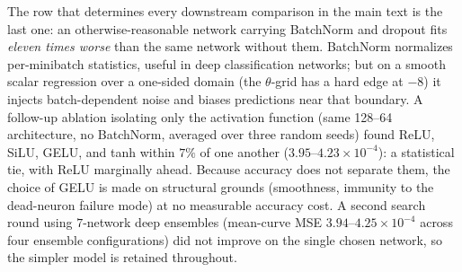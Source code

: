 \documentclass[11pt]{article}
\begin{document}
The row that determines every downstream comparison in the main text is the
last one: an otherwise-reasonable network carrying BatchNorm and dropout fits
\emph{eleven times worse} than the same network without them. BatchNorm
normalizes per-minibatch statistics, useful in deep classification networks;
but on a smooth scalar regression over a one-sided domain (the $\theta$-grid
has a hard edge at $-8$) it injects batch-dependent noise and biases
predictions near that boundary. A follow-up ablation isolating only the
activation function (same 128--64 architecture, no BatchNorm, averaged over
three random seeds) found ReLU, SiLU, GELU, and tanh within $7\%$ of one
another ($3.95$--$4.23\times10^{-4}$): a statistical tie, with ReLU
marginally ahead. Because accuracy does not separate them, the choice of
GELU is made on structural grounds (smoothness, immunity to the dead-neuron
failure mode) at no measurable accuracy cost. A second search round using
$7$-network deep ensembles (mean-curve MSE $3.94$--$4.25\times10^{-4}$
across four ensemble configurations) did not improve on the single chosen
network, so the simpler model is retained throughout.

\begin{table}[h]
\centering
\caption{One-dimensional model: does capacity matter? Curve MSE is
against the denoised response curve, mean over three seeds. Downstream
MSE and 95\% CI length are DNN-ABC at the same scale as the main text's
mean-squared-error table ($40$ replicates/cell, full $p\times J$ grid), one
seed per row.}
\label{stab:capacity1D}
\setlength{\tabcolsep}{4.5pt}
\end{table}
\end{document}
